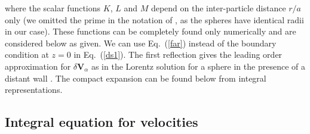 where the scalar functions $K$, $L$ and $M$ depend on the inter-particle distance $r/a$ only (we omitted the prime in the notation of \cite{batchelor_green_1972}, as the spheres have identical radii in our case). These functions can be completely found only numerically and are considered below as given. We can use Eq.~(\ref{far}) instead of the boundary condition at $z=0$ in Eq.~(\ref{ds1}). The first reflection \cite{hb} gives the leading order approximation for $\delta\bm V_{\alpha}$ as in the Lorentz solution for a sphere in the presence of a distant wall \cite{hb}. The compact expansion can be found below from integral representations.

\subsection{Integral equation for velocities}

